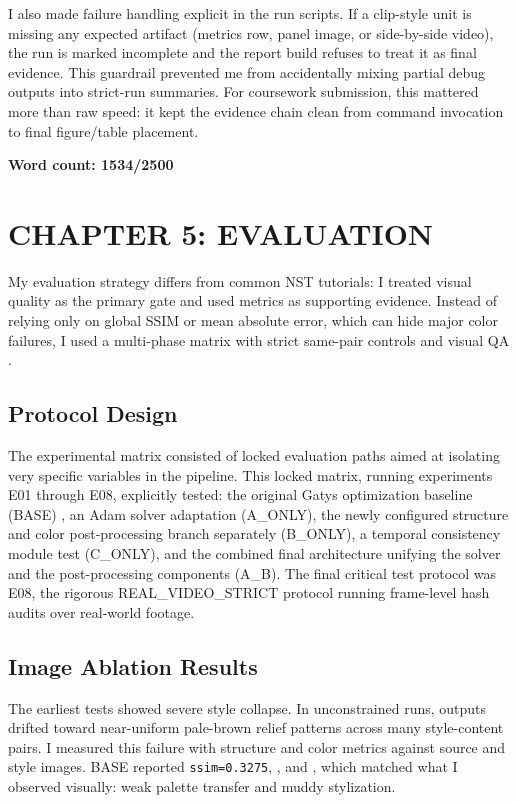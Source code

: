\documentclass[12pt,letterpaper]{article}
\begin{document}
I also made failure handling explicit in the run scripts. If a clip-style unit is missing any expected artifact (metrics row, panel image, or side-by-side video), the run is marked incomplete and the report build refuses to treat it as final evidence. This guardrail prevented me from accidentally mixing partial debug outputs into strict-run summaries. For coursework submission, this mattered more than raw speed: it kept the evidence chain clean from command invocation to final figure/table placement.

\textbf{Word count: 1534/2500}

\setcounter{section}{5}
\setcounter{subsection}{0}
\section*{CHAPTER 5: EVALUATION}
My evaluation strategy differs from common NST tutorials: I treated visual quality as the primary gate and used metrics as supporting evidence. Instead of relying only on global SSIM or mean absolute error, which can hide major color failures, I used a multi-phase matrix with strict same-pair controls and visual QA \cite{jing2018review}.

\subsection{Protocol Design}

The experimental matrix consisted of locked evaluation paths aimed at isolating very specific variables in the pipeline. This locked matrix, running experiments E01 through E08, explicitly tested: the original Gatys optimization baseline (BASE) \cite{gatys2016}, an Adam solver adaptation (A\_ONLY), the newly configured structure and color post-processing branch separately (B\_ONLY), a temporal consistency module test (C\_ONLY), and the combined final architecture unifying the solver and the post-processing components (A\_B). The final critical test protocol was E08, the rigorous REAL\_VIDEO\_STRICT protocol running frame-level hash audits over real-world footage.

\subsection{Image Ablation Results}

The earliest tests showed severe style collapse. In unconstrained runs, outputs drifted toward near-uniform pale-brown relief patterns across many style-content pairs. I measured this failure with structure and color metrics against source and style images. BASE reported \texttt{ssim=0.3275}, , and , which matched what I observed visually: weak palette transfer and muddy stylization.
\end{document}
